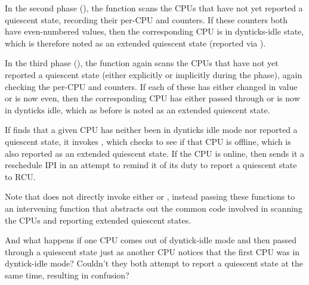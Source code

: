 In the second phase (), the
 function scans the CPUs that
have not yet reported a quiescent state, recording their per-CPU
 and  counters.
If these counters both have even-numbered values, then the corresponding
CPU is in dynticks-idle state, which is therefore noted as an extended
quiescent state (reported via ).

In the third phase (), the
 function again scans the CPUs
that have not yet reported a quiescent state (either explicitly or
implicitly during the  phase), again checking the
per-CPU  and  counters.
If each of these has either changed in value or is now even, then
the corresponding CPU has either passed through or is now in dynticks
idle, which as before is noted as an extended quiescent state.

If  finds that a given CPU
has neither been in dynticks idle mode nor reported a quiescent state,
it invokes , which checks to see
if that CPU is offline, which is also reported as an extended quiescent
state.
If the CPU is online, then  sends
it a reschedule IPI in an attempt to remind it of its duty to report
a quiescent state to RCU.

Note that  does not directly
invoke either  or
, instead passing these functions
to an intervening  function that
abstracts out the common code involved in scanning the CPUs and reporting
extended quiescent states.

\QuickQuiz{}
	And what happens if one CPU comes out of dyntick-idle mode and then
	passed through a quiescent state just as another CPU notices that the
	first CPU was in dyntick-idle mode?
	Couldn't they both attempt to report a quiescent state at the same
	time, resulting in confusion?
 \QuickQuizEnd

